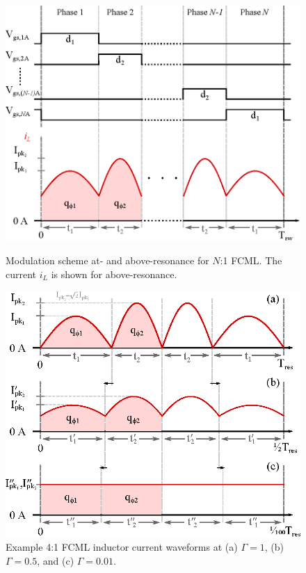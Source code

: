 \begin{figure}[t]
\vspace{-25pt}
\begin{minipage}[H]{0.45\linewidth}
    \centering
    \vspace{8pt}
    \includegraphics[width=1\linewidth]{Figures/FCML_gate2.eps} %
    \caption{Modulation scheme at- and above-resonance for $N$:1 FCML. The current $i_{L}$ is shown for above-resonance.}
    \label{fig:gate_signals}
\end{minipage}
\hspace{20pt}
\begin{minipage}[H]{0.45\linewidth}
    \centering
    \includegraphics[width=1\linewidth]{Figures/iL_freq_range.eps}
    \caption{Example 4:1 FCML inductor current waveforms at (a) $\Gamma=1$, (b) $\Gamma=0.5$, and (c) $\Gamma=0.01$.}
    \label{fig:iL_freq}
\end{minipage}
\vspace{-10pt}
\end{figure}




